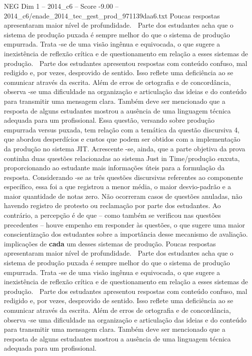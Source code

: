 \begin{textsample}{NEG Dim 1 – 2014\_c6 – Score -9.00 – 2014\_c6/enade\_2014\_tec\_gest\_prod\_971139daa6.txt}
Poucas respostas apresentaram maior nível de profundidade.  Parte dos estudantes acha que o sistema de produção puxada é sempre melhor do que o sistema de produção empurrada.
Trata -se de uma visão ingênua e equivocada, o que sugere a inexistência de reflexão crítica e de questionamento em relação a esses sistemas de produção.  Parte dos estudantes apresentou respostas com conteúdo confuso, mal redigido e, por vezes, desprovido de sentido.
Isso reflete uma deficiência ao se comunicar através da escrita.
Além de erros de ortografia e de concordância, observa -se uma dificuldade na organização e articulação das ideias e do conteúdo para transmitir uma mensagem clara.
Também deve ser mencionado que a resposta de alguns estudantes mostrou a ausência de uma linguagem técnica adequada para um profissional.
Essa questão, versando sobre produção empurrada versus puxada, tem relação com a temática da questão discursiva 4, que abordou desperdícios e custos que podem ser obtidos com a implementação da produção no sistema JIT.
Acrescente -se, ainda, que a parte objetiva da prova continha duas questões relacionadas ao sistema Just in Time/produção enxuta, proporcionando ao estudante mais informações úteis para a formulação da resposta.
Considerando -se as três questões discursivas referentes ao componente específico, essa foi a que registrou a menor média, o maior desvio-padrão e a maior quantidade de notas zero.
Não ocorreram casos de questões anuladas, não havendo registro de protesto ou reclamação por parte dos estudantes.
Ao contrário, a percepção é de que – como também se verificou nas questões precedentes – houve empenho em responder às questões, o que sugere uma maior conscientização dos estudantes sobre a importância desse mecanismo de avaliação. implicações de \textbf{cada} um desses sistemas de produção.
Poucas respostas apresentaram maior nível de profundidade.  Parte dos estudantes acha que o sistema de produção puxada é sempre melhor do que o sistema de produção empurrada.
Trata -se de uma visão ingênua e equivocada, o que sugere a inexistência de reflexão crítica e de questionamento em relação a esses sistemas de produção.  Parte dos estudantes apresentou respostas com conteúdo confuso, mal redigido e, por vezes, desprovido de sentido.
Isso reflete uma deficiência ao se comunicar através da escrita.
Além de erros de ortografia e de concordância, observa -se uma dificuldade na organização e articulação das ideias e do conteúdo para transmitir uma mensagem clara.
Também deve ser mencionado que a resposta de alguns estudantes mostrou a ausência de uma linguagem técnica adequada para um profissional.

\end{textsample}
